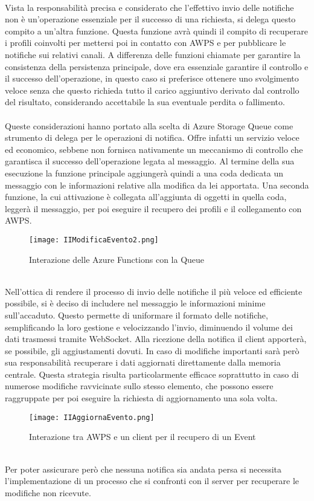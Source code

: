 \\
Vista la responsabilità precisa e considerato che 
l'effettivo invio delle notifiche non è un'operazione essenziale 
per il successo di una richiesta,
si delega questo compito a un'altra funzione.
Questa funzione avrà quindi il compito di recuperare i profili coinvolti
per mettersi poi in contatto con AWPS e per pubblicare le notifiche sui relativi canali.
A differenza delle funzioni chiamate per garantire la consistenza della persistenza principale,
dove era essenziale garantire il controllo e il successo dell'operazione, 
in questo caso si preferisce ottenere uno svolgimento veloce senza 
che questo richieda tutto il carico aggiuntivo derivato dal controllo del risultato,
considerando accettabile la sua eventuale perdita o fallimento.\\
\\
Queste considerazioni hanno portato alla scelta di Azure Storage Queue
come strumento di delega per le operazioni di notifica.
Offre infatti un servizio veloce ed economico, 
sebbene non fornisca nativamente un meccanismo di controllo 
che garantisca il successo dell'operazione legata al messaggio.
Al termine della sua esecuzione la funzione principale aggiungerà quindi
a una coda dedicata un messaggio con le informazioni relative 
alla modifica da lei apportata.
Una seconda funzione, la cui attivazione è collegata all'aggiunta di oggetti in quella coda,
leggerà il messaggio, per poi eseguire il recupero dei profili e il collegamento con AWPS.\\
\begin{figure}[htpb]
    \centering
    \texttt{[image: IIModificaEvento2.png]}
    \caption{Interazione delle Azure Functions con la Queue}
\end{figure}
\\
Nell'ottica di rendere il processo di invio delle notifiche 
il più veloce ed efficiente possibile, 
si è deciso di includere nel messaggio le informazioni minime sull'accaduto.
Questo permette di uniformare il formato delle notifiche, 
semplificando la loro gestione e velocizzando l'invio,
diminuendo il volume dei dati trasmessi tramite WebSocket.
Alla ricezione della notifica il client apporterà, se possibile,
gli aggiustamenti dovuti.
In caso di modifiche importanti sarà però sua responsabilità 
recuperare i dati aggiornati direttamente dalla memoria centrale.
Questa strategia risulta particolarmente efficace 
soprattutto in caso di 
numerose modifiche ravvicinate sullo stesso elemento, 
che possono essere raggruppate per poi eseguire la richiesta di aggiornamento una sola volta.\\
\begin{figure}[htpb]
    \centering
    \texttt{[image: IIAggiornaEvento.png]}
    \caption{Interazione tra AWPS e un client per il recupero di un Event}
\end{figure}	
\\
Per poter assicurare però che nessuna notifica sia andata persa
si necessita l'implementazione di un processo che
si confronti con il server per recuperare le modifiche non ricevute.\\
\clearpage
